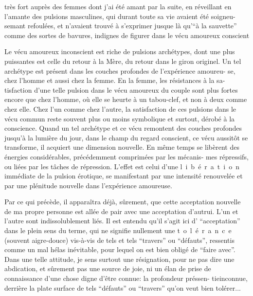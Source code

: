 très fort auprès des femmes dont j'ai été amant par la suite, en réveillant en
l'amante des pulsions masculines, qui durant toute sa vie avaient été soigneu-\linebreak
semant refoulées, et n'avaient trouvé à s'exprimer jusque là qu'``à la sauvette''
comme des sortes de bavures, indignes de figurer dans le vécu amoureux conscient

Le vécu amoureux inconscient est riche de pulsions archétypes, dont une 
plus puissantes est celle du retour à la Mère, du retour dans le giron originel.
Un tel archétype est présent dans les couches profondes de l'expérience amoureu-\linebreak
se, chez l'homme et aussi chez la femme. En la femme, les résistances à la sa-\linebreak
tisfaction d'une telle pulsion dans le vécu amoureux du couple sont plus fortes
encore que chez l'homme, où elle se heurte à un tabou-clef, et non à deux comme
chez elle. Chez l'un comme chez l'autre, la satisfaction de ces pulsions \unsure{-}dans
le vécu commun reste souvent plus ou moins symbolique et surtout,
dérobé à la conscience. Quand un tel archétype et ce vécu remontent des couches
profondes jusqu'à la lumière du jour, dans le champ du regard conscient, ce
vécu aussitôt se transforme, il acquiert une dimension nouvelle. En même temps
se libèrent des énergies considérables, précédemment comprimées par les mécanis-\linebreak
mes répressifs, ou liées par les tâches de répression. L'effet est celui d'une
\mbox{l i b é r a t i o n} immédiate de la pulsion érotique, se manifestant par une
intensité renouvelée et par une plénitude nouvelle dans l'expérience amoureuse.

Par ce qui précède, il apparaîtra déjà, sûrement, que cette acceptation
nouvelle de ma propre personne est allée de pair avec une acceptation d'autrui.
L'un et l'autre sont indissolublement liés. Il est entendu qu'il s'agit ici
d' ``acceptation'' dans le plein sens du terme, qui ne signifie nullement une
\mbox{t o l é r a n c e} (souvent aigre-douce) vis-à-vis de tels et tels ``travers'' ou
``défauts'', ressentis comme un mal hélas inévitable, pour lequel on est bien
obligé de ``faire avec''. Dans une telle attitude, je sens surtout une résignation,
pour ne pas dire une abdication, et sûrement pas une source de joie, ni un élan
de prise de connaissance d'une chose digne d'être connue: la profondeur préssen-\linebreak
tie\inserted{,}inconnue, derrière la plate surface de tels ``défauts'' ou ``travers'' qu'on
veut bien tolérer...

